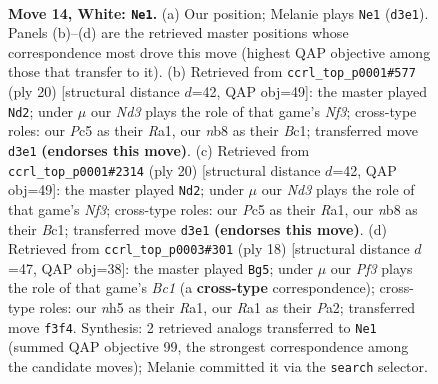 \documentclass[11pt]{article}
\begin{document}
\clearpage

\begin{figure}[p]\centering
\begin{subfigure}{0.46\textwidth}\centering
\resizebox{\linewidth}{!}{%
\newchessgame
\chessboard[
  setfen={rn2bbr1/1p2kppp/p3p3/2P4n/P1B5/2NNPP2/1P4PP/R1B2RK1 w - - 3 14},
  showmover=false,
  pgfstyle=straightmove, color=movearrow, markmove={d3-e1}
]}
\caption{}
\end{subfigure}\hfill
\begin{subfigure}{0.46\textwidth}\centering
\resizebox{\linewidth}{!}{%
\newchessgame
\chessboard[
  setfen={rnb4r/4kppp/p3pn2/1pb5/8/2N1PN2/PP2BPPP/R1B2RK1 w - - 0 11},
  showmover=false,
  pgfstyle=straightmove, color=movearrow, markmove={f3-d2}
]}
\caption{}
\end{subfigure}
\\[4pt]
\begin{subfigure}{0.46\textwidth}\centering
\resizebox{\linewidth}{!}{%
\newchessgame
\chessboard[
  setfen={rnb4r/4kppp/p3pn2/1pb5/8/2N1PN2/PP2BPPP/R1B2RK1 w - - 0 11},
  showmover=false,
  pgfstyle=straightmove, color=movearrow, markmove={f3-d2}
]}
\caption{}
\end{subfigure}\hfill
\begin{subfigure}{0.46\textwidth}\centering
\resizebox{\linewidth}{!}{%
\newchessgame
\chessboard[
  setfen={rnbr2k1/1pp2pbp/p4np1/4p3/2P1P3/2N2N2/PP2BPPP/R1B2RK1 w - - 0 10},
  showmover=false,
  pgfstyle=straightmove, color=movearrow, markmove={c1-g5}
]}
\caption{}
\end{subfigure}
\caption{\textbf{Move 14, White: \texttt{Ne1}.} (a) Our position; Melanie plays \texttt{Ne1} (\texttt{d3e1}). Panels (b)--(d) are the retrieved master positions whose correspondence most drove this move (highest QAP objective among those that transfer to it). (b) Retrieved from \texttt{ccrl\_top\_p0001\#577} (ply 20) [structural distance $d$=42, QAP obj=49]: the master played \texttt{Nd2}; under $\mu$ our \emph{Nd3} plays the role of that game's \emph{Nf3}; cross-type roles: our \emph{P}c5 as their \emph{R}a1, our \emph{n}b8 as their \emph{B}c1; transferred move \texttt{d3e1} \textbf{(endorses this move)}. (c) Retrieved from \texttt{ccrl\_top\_p0001\#2314} (ply 20) [structural distance $d$=42, QAP obj=49]: the master played \texttt{Nd2}; under $\mu$ our \emph{Nd3} plays the role of that game's \emph{Nf3}; cross-type roles: our \emph{P}c5 as their \emph{R}a1, our \emph{n}b8 as their \emph{B}c1; transferred move \texttt{d3e1} \textbf{(endorses this move)}. (d) Retrieved from \texttt{ccrl\_top\_p0003\#301} (ply 18) [structural distance $d$=47, QAP obj=38]: the master played \texttt{Bg5}; under $\mu$ our \emph{Pf3} plays the role of that game's \emph{Bc1} (a \textbf{cross-type} correspondence); cross-type roles: our \emph{n}h5 as their \emph{R}a1, our \emph{R}a1 as their \emph{P}a2; transferred move \texttt{f3f4}. Synthesis: 2 retrieved analogs transferred to \texttt{Ne1} (summed QAP objective 99, the strongest correspondence among the candidate moves); Melanie committed it via the \texttt{search} selector.}
\label{fig:thought-m26}
\end{figure}
\end{document}
